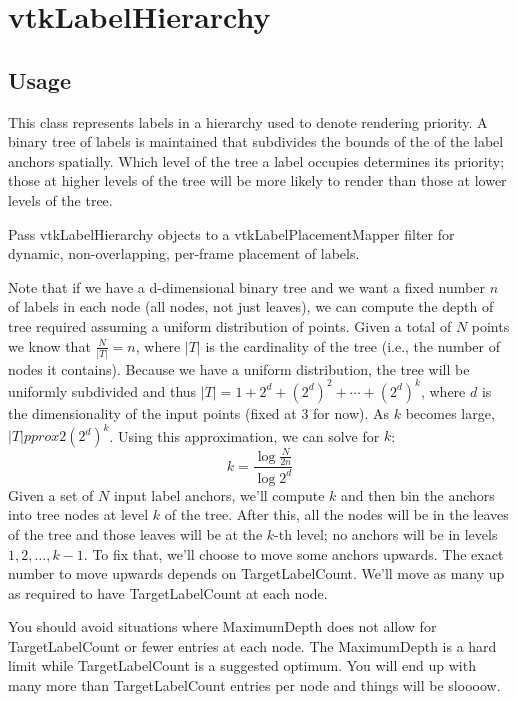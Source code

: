 \section{vtkLabelHierarchy}

\subsection{Usage}

 This class represents labels in a hierarchy used to denote rendering priority.
 A binary tree of labels is maintained that subdivides the bounds of the
 of the label anchors spatially. Which level of the tree a label occupies
 determines its priority; those at higher levels of the tree will be
 more likely to render than those at lower levels of the tree.

 Pass vtkLabelHierarchy objects to a vtkLabelPlacementMapper filter for dynamic,
 non-overlapping, per-frame placement of labels.

 Note that if we have a d-dimensional binary tree and we want a fixed
 number $n$ of labels in each node (all nodes, not just leaves),
 we can compute the depth of tree required assuming a uniform distribution
 of points. Given a total of $N$ points we know that
 $\frac{N}{|T|} = n$, where $|T|$ is the cardinality of the tree (i.e.,
 the number of nodes it contains).
 Because we have a uniform distribution, the tree will be uniformly subdivided
 and thus $|T| = 1 + 2^d + \left(2^d\right)^2 + \cdots + \left(2^d\right)^k$,
 where $d$ is the dimensionality of the input points (fixed at 3 for now).
 As $k$ becomes large, $|T|pprox 2 \left(2^d\right)^k$.
 Using this approximation, we can solve for $k$:
 \[ k = \frac{\log{\frac{N}{2n}}}{\log{2^d}} \]
 Given a set of $N$ input label anchors, we'll compute $k$ and then
 bin the anchors into tree nodes at level $k$ of the tree. After this,
 all the nodes will be in the leaves of the tree and those leaves will be at
 the $k$-th level; no anchors will be in levels $1, 2, \ldots, k-1$.
 To fix that, we'll choose to move some anchors upwards.
 The exact number to move upwards depends on  TargetLabelCount. We'll
 move as many up as required to have  TargetLabelCount at each node.

 You should avoid situations where  MaximumDepth does not allow for
  TargetLabelCount or fewer entries at each node. The  MaximumDepth
 is a hard limit while  TargetLabelCount is a suggested optimum. You will
 end up with many more than  TargetLabelCount entries per node and things
 will be sloooow.

